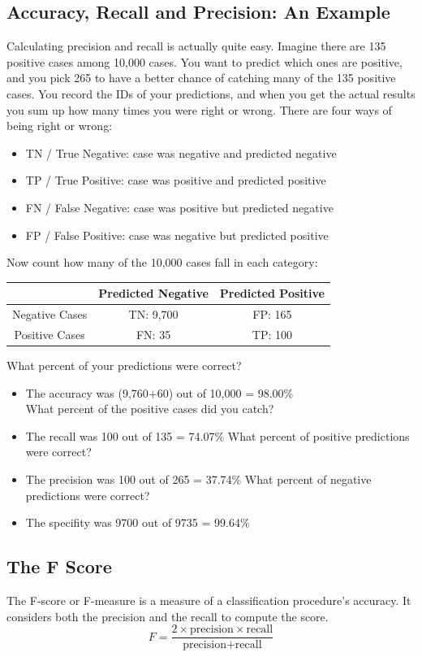 \documentclass[a4paper,12pt]{article}
\begin{document}
\subsection*{Accuracy, Recall and Precision: An Example}
Calculating precision and recall is actually quite easy. Imagine there are
135 positive cases among 10,000 cases. You want to predict which ones are
positive, and you pick 265 to have a better chance of catching many of the
135 positive cases. You record the IDs of your predictions, and when you
get the actual results you sum up how many times you were right or wrong.
There are four ways of being right or wrong:
\begin{itemize}
\item TN / True Negative: case was negative and predicted negative
\item TP / True Positive: case was positive and predicted positive
\item  FN / False Negative: case was positive but predicted negative
\item FP / False Positive: case was negative but predicted positive
\end{itemize}
Now count how many of the 10,000 cases fall in each category:
\begin{center}
\begin{tabular}{|c|c|c|}
  & Predicted Negative & Predicted Positive \\ \hline
Negative Cases & TN: 9,700 & FP: 165 \\ \hline
Positive Cases &  FN: 35 & TP: 100 \\ \hline
\end{tabular}
\end{center}
What percent of your predictions were correct?
\begin{itemize}
	\item The accuracy was (9,760+60) out of 10,000 = 98.00\%\\
	What percent of the positive cases did you catch?
	\item The recall was 100 out of 135 = 74.07\%
	What percent of positive predictions were correct?\\
	\item The precision was 100 out of 265 = 37.74\%
	What percent of negative predictions were correct? \\
	\item The specifity was 9700 out of 9735 = 99.64\%
\end{itemize}

\subsection*{The F Score}
The F-score or F-measure is a measure of a classification procedure’s accuracy.
It considers both the precision and the recall to compute the score.
\[ F = \frac{2 \times \mbox{precision} \times \mbox{recall}}{\mbox{precision} + \mbox{recall}}\]
\end{document}
